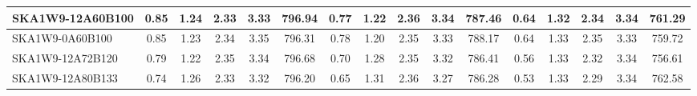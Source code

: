 \begin{table}[H]
{{\begin{tabular}{|lccccc||ccccc||ccccc|}
SKA1W9-12A60B100 & 0.85 \cellcolor{blue!56.48} & 1.24 \cellcolor{red!23.60} & 2.33 \cellcolor{green!18.00} & 3.33 \cellcolor{orange!24.93} & 796.94 \cellcolor{purple!40.15} & 0.77 \cellcolor{blue!52.66} & 1.22 \cellcolor{red!22.43} & 2.36 \cellcolor{green!60.00} & 3.34 \cellcolor{orange!58.50} & 787.46 \cellcolor{purple!33.00} & 0.64 \cellcolor{blue!46.86} & 1.32 \cellcolor{red!35.04} & 2.34 \cellcolor{green!56.55} & 3.34 \cellcolor{orange!36.48} & 761.29 \cellcolor{purple!44.91}\\ \hline 
SKA1W9-0A60B100 & 0.85 \cellcolor{blue!57.41} & 1.23 \cellcolor{red!20.58} & 2.34 \cellcolor{green!39.76} & 3.35 \cellcolor{orange!60.00} & 796.31 \cellcolor{purple!35.82} & 0.78 \cellcolor{blue!53.39} & 1.20 \cellcolor{red!18.00} & 2.35 \cellcolor{green!31.77} & 3.33 \cellcolor{orange!51.34} & 788.17 \cellcolor{purple!42.10} & 0.64 \cellcolor{blue!46.62} & 1.33 \cellcolor{red!50.58} & 2.35 \cellcolor{green!60.00} & 3.33 \cellcolor{orange!18.00} & 759.72 \cellcolor{purple!35.92}\\ \hline 
SKA1W9-12A72B120 & 0.79 \cellcolor{blue!44.29} & 1.22 \cellcolor{red!18.00} & 2.35 \cellcolor{green!60.00} & 3.34 \cellcolor{orange!37.03} & 796.68 \cellcolor{purple!38.34} & 0.70 \cellcolor{blue!37.95} & 1.28 \cellcolor{red!44.74} & 2.35 \cellcolor{green!18.00} & 3.32 \cellcolor{orange!44.88} & 786.41 \cellcolor{purple!19.67} & 0.56 \cellcolor{blue!26.13} & 1.33 \cellcolor{red!55.52} & 2.32 \cellcolor{green!35.63} & 3.34 \cellcolor{orange!36.20} & 756.61 \cellcolor{purple!18.00}\\ \hline 
SKA1W9-12A80B133 & 0.74 \cellcolor{blue!36.07} & 1.26 \cellcolor{red!31.52} & 2.33 \cellcolor{green!26.40} & 3.32 \cellcolor{orange!18.00} & 796.20 \cellcolor{purple!35.05} & 0.65 \cellcolor{blue!27.96} & 1.31 \cellcolor{red!54.40} & 2.36 \cellcolor{green!52.20} & 3.27 \cellcolor{orange!18.00} & 786.28 \cellcolor{purple!18.00} & 0.53 \cellcolor{blue!18.00} & 1.33 \cellcolor{red!51.48} & 2.29 \cellcolor{green!18.00} & 3.34 \cellcolor{orange!35.78} & 762.58 \cellcolor{purple!52.35}\\ \hline 
\end{tabular}}
\vspace{-0.300000cm}
\hspace{1cm} 
}
\end{table}
